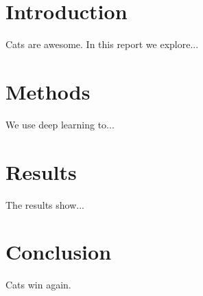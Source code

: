 \def\university{University of Example}
\def\department{Department of Computer Science}
\def\titletext{Deep Learning for Cats}
\def\subtitle{Final Project Report}
\def\courseid{CS101}
\def\authorA{Alice Example}
\def\authorB{Bob Example}
\def\emailA{alice@example.edu}
\def\emailB{bob@example.edu}
\def\supervisor{Prof. Cat Lover}
\def\repositoryurl{https://github.com/example/cats}
\def\repositoryname{example/cats}
\def\toc{1}







\section{Introduction}
Cats are awesome. In this report we explore...

\section{Methods}
We use deep learning to...

\section{Results}
The results show...

\section{Conclusion}
Cats win again.



